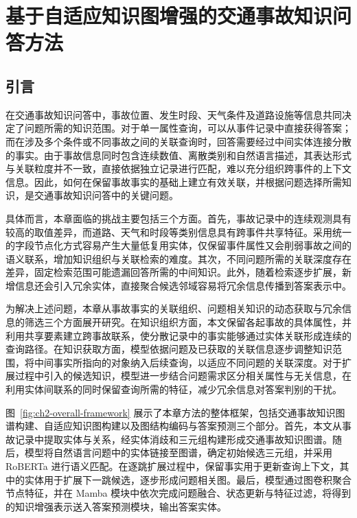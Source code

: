 
\chapter{基于自适应知识图增强的交通事故知识问答方法}

\section{引言}

在交通事故知识问答中，事故位置、发生时段、天气条件及道路设施等信息共同决定了问题所需的知识范围。对于单一属性查询，可以从事件记录中直接获得答案；而在涉及多个条件或不同事故之间的关联查询时，回答需要经过中间实体连接分散的事实。由于事故信息同时包含连续数值、离散类别和自然语言描述，其表达形式与关联粒度并不一致，直接依据独立记录进行匹配，难以充分组织跨事件的上下文信息。因此，如何在保留事故事实的基础上建立有效关联，并根据问题选择所需知识，是交通事故知识问答中的关键问题。

具体而言，本章面临的挑战主要包括三个方面。首先，事故记录中的连续观测具有较高的取值差异，而道路、天气和时段等类别信息具有跨事件共享特征。采用统一的字段节点化方式容易产生大量低复用实体，仅保留事件属性又会削弱事故之间的语义联系，增加知识组织与关联检索的难度。其次，不同问题所需的关联深度存在差异，固定检索范围可能遗漏回答所需的中间知识。此外，随着检索逐步扩展，新增信息还会引入冗余实体，直接聚合候选邻域容易将冗余信息传播到答案表示中。

为解决上述问题，本章从事故事实的关联组织、问题相关知识的动态获取与冗余信息的筛选三个方面展开研究。在知识组织方面，本文保留各起事故的具体属性，并利用共享要素建立跨事故联系，使分散记录中的事实能够通过实体关联形成连续的查询路径。在知识获取方面，模型依据问题及已获取的关联信息逐步调整知识范围，将中间事实所指向的对象纳入后续查询，以适应不同问题的关联深度。对于扩展过程中引入的候选知识，模型进一步结合问题需求区分相关属性与无关信息，在利用实体间联系的同时保留查询所需的特征，减少冗余信息对答案判别的干扰。

图~\ref{fig:ch2-overall-framework} 展示了本章方法的整体框架，包括交通事故知识图谱构建、自适应知识图构建以及图结构编码与答案预测三个部分。首先，本文从事故记录中提取实体与关系，经实体消歧和三元组构建形成交通事故知识图谱。随后，模型将自然语言问题中的实体链接至图谱，确定初始候选三元组，并采用 RoBERTa 进行语义匹配。在逐跳扩展过程中，保留事实用于更新查询上下文，其中的实体用于扩展下一跳候选，逐步形成问题相关图。最后，模型通过图卷积聚合节点特征，并在 Mamba 模块中依次完成问题融合、状态更新与特征过滤，将得到的知识增强表示送入答案预测模块，输出答案实体。


